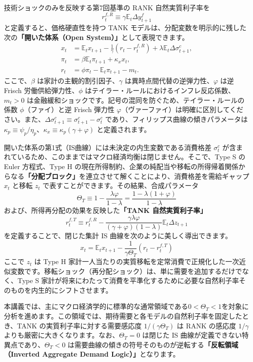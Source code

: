 \documentclass[
  japanese,
  lualatex,
  ja=standard,
  12pt,
  a4paper]{ltjsarticle}
\begin{document}
技術ショックのみを反映する第7回基準の RANK 自然実質利子率を \[
r_t^{f,R} \equiv \gamma \mathbb{E}_t \Delta y_{t+1}^f
\] と定義すると、価格硬直性を持つ TANK
モデルは、分配変数を明示的に残した次の\textbf{「開いた体系（Open
System）」}として表現できます。 \[
\begin{aligned}
x_t
&=
\mathbb{E}_t x_{t+1}
-
\frac{1}{\gamma}(r_t - r_t^{f,R})
+
\lambda \mathbb{E}_t \Delta \sigma_{t+1}^c,
\\
\pi_t
&=
\beta \mathbb{E}_t \pi_{t+1}
+
\kappa_x x_t,
\\
r_t
&=
\phi \pi_t - \mathbb{E}_t \pi_{t+1} - m_t.
\end{aligned}
\] ここで、\(\beta\) は家計の主観的割引因子、\(\gamma\)
は異時点間代替の逆弾力性、\(\varphi\) は逆 Frisch
労働供給弾力性、\(\phi\)
はテイラー・ルールにおけるインフレ反応係数、\(m_t>0\)
は金融緩和ショックです。記号の混同を防ぐため、テイラー・ルールの係数
\(\phi\)（ファイ）と逆 Frisch 弾力性
\(\varphi\)（ヴァーファイ）は明確に区別してください。また、\(\Delta \sigma_{t+1}^c \equiv \sigma_{t+1}^c - \sigma_t^c\)
であり、フィリップス曲線の傾きパラメータは
\(\kappa_p \equiv \psi_p / \eta_p\)、\(\kappa_x \equiv \kappa_p(\gamma+\varphi)\)
と定義されます。


開いた体系の第1式（IS曲線）には未決定の内生変数である消費格差
\(\sigma_t^c\)
が含まれているため、このままではマクロ経済均衡は閉じません。そこで、Type
S の Euler 方程式、Type H
の現在所得制約、企業の純配当や移転の所得帰着関係からなる\textbf{「分配ブロック」}を連立させて解くことにより、消費格差を需給ギャップ
\(x_t\) と移転 \(z_t\) で表すことができます。その結果、合成パラメータ \[
\Theta_T \equiv 1 - \frac{\lambda \varphi}{1-\lambda} = \frac{1 - \lambda(1+\varphi)}{1-\lambda}
\] および、所得再分配の効果を反映した\textbf{「TANK 自然実質利子率」} \[
r_t^{f,T}
\equiv
r_t^{f,R}
-
\frac{\gamma \lambda \varphi}{(\gamma+\varphi)(1-\lambda)} \mathbb{E}_t \Delta z_{t+1}
\] を定義することで、閉じた集計 IS 曲線を次のように美しく導出できます。
\[
x_t
=
\mathbb{E}_t x_{t+1}
-
\frac{1}{\gamma \Theta_T} (r_t - r_t^{f,T})
\] ここで \(z_t\) は Type H
家計一人当たりの実質移転を定常消費で正規化した一次近似変数です。移転ショック（再分配ショック）は、単に需要を追加するだけでなく、Type
S
家計が将来にわたって消費を平準化するために必要な自然利子率そのものを内生的にシフトさせます。

本講義では、主にマクロ経済学的に標準的な通常領域である\textbf{\(0<\Theta_T<1\)}を対象に分析を進めます。この領域では、期待需要と各モデルの自然利子率を固定したとき、TANK
の実質利子率に対する需要感応度 \(1/(\gamma \Theta_T)\) は RANK の感応度
\(1/\gamma\) よりも厳密に大きくなります。なお、\(\Theta_T=0\) は閉じた
IS 曲線が定義できない特異点であり、\(\Theta_T<0\)
は需要曲線の傾きの符号そのものが逆転する\textbf{「反転領域（Inverted
Aggregate Demand Logic）」}となります。
\end{document}
